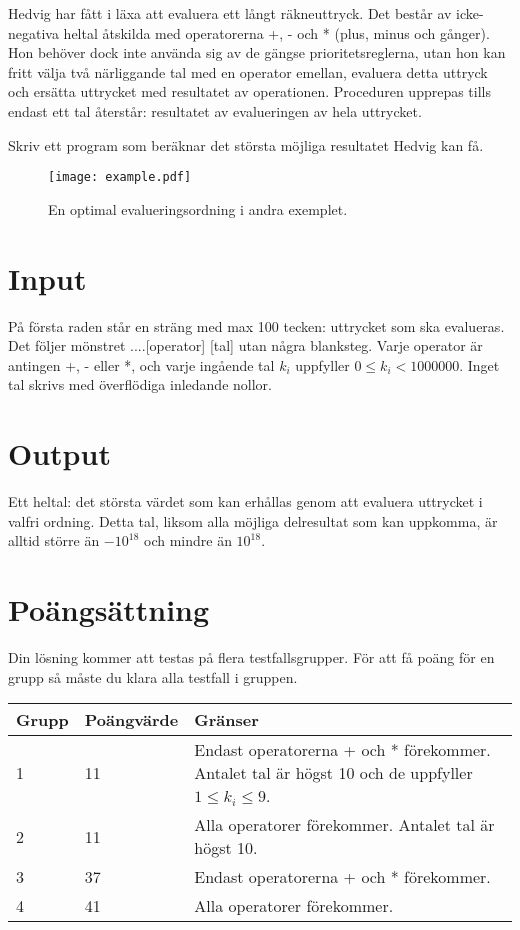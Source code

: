 
Hedvig har fått i läxa att evaluera ett långt räkneuttryck. Det består av icke-negativa heltal åtskilda med operatorerna +, - och * (plus, minus och gånger). Hon behöver dock inte använda sig av de gängse prioritetsreglerna, utan hon kan fritt välja två närliggande tal med en operator emellan, evaluera detta uttryck och ersätta uttrycket med resultatet av operationen. Proceduren upprepas tills endast ett tal återstår: resultatet av evalueringen av hela uttrycket.

Skriv ett program som beräknar det största möjliga resultatet Hedvig kan få.

\begin{figure}[ht!]
\centering
\texttt{[image: example.pdf]}
\caption{En optimal evalueringsordning i andra exemplet.}
\label{overflow}
\end{figure}

\section*{Input}

På första raden står en sträng med max 100 tecken: uttrycket som ska evalueras. Det följer mönstret \newline
[tal] [operator] [tal] [operator]....[operator] [tal] \newline
utan några blanksteg. Varje operator är antingen +, - eller *, och varje ingående tal $k_i$ uppfyller $0\leq k_i < 1000000$. Inget tal skrivs med överflödiga inledande nollor.

\section*{Output}

Ett heltal: det största värdet som kan erhållas genom att evaluera uttrycket i valfri ordning. Detta tal, liksom alla möjliga delresultat som kan uppkomma, är alltid större än $-10^{18}$ och mindre än $10^{18}$.


\section*{Poängsättning}
Din lösning kommer att testas på flera testfallsgrupper. För att få poäng för en grupp
så måste du klara alla testfall i gruppen.

\begin{tabular}{| l | l | l |}
\hline
Grupp & Poängvärde & Gränser \\ \hline
1     & 11         & Endast operatorerna + och * förekommer. Antalet tal är högst 10 och de uppfyller $1\leq k_i \leq 9$. \\
2     & 11         & Alla operatorer förekommer. Antalet tal är högst 10. \\
3     & 37         & Endast operatorerna + och * förekommer.\\ 
4     & 41         & Alla operatorer förekommer. \\ \hline
\end{tabular}


